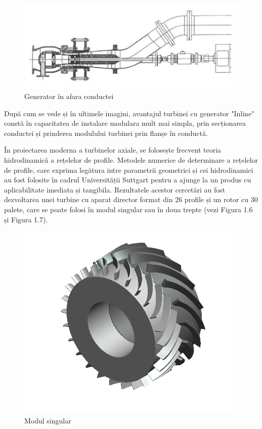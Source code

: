 \begin{figure}[h!]
	\centering
	\includegraphics[scale=1]{figures/generator_in_afara_conductei.jpg}
	\caption{Generator în afara conductei \cite{GREES_2014}}
	\label{Generator în afara conductei}
\end{figure}

După cum se vede și în ultimele imagini, avantajul turbinei cu generator "Inline" constă în capacitatea de instalare modulara mult mai simpla, prin secționarea conductei și prinderea modulului turbinei prin flanșe în conductă.

În proiectarea moderna a turbinelor axiale, se folosește frecvent teoria hidrodinamică a rețelelor de profile. Metodele numerice de determinare a rețelelor de profile, care exprima legătura intre parametrii geometrici și cei hidrodinamici au fost folosite în cadrul Universității Suttgart pentru a ajunge la un produs cu aplicabilitate imediata și tangibila. Rezultatele acestor cercetări au fost dezvoltarea unei turbine cu aparat director format din 26 profile și un rotor cu 30 palete, care se poate folosi în modul singular sau în doua trepte (vezi Figura 1.6 și Figura 1.7).

\begin{figure}[h!]
	\centering
	\includegraphics[scale=0.6]{figures/modul_singular.png}
	\caption{Modul singular \cite{susanhub}}
	\label{Modul singular}
\end{figure}

